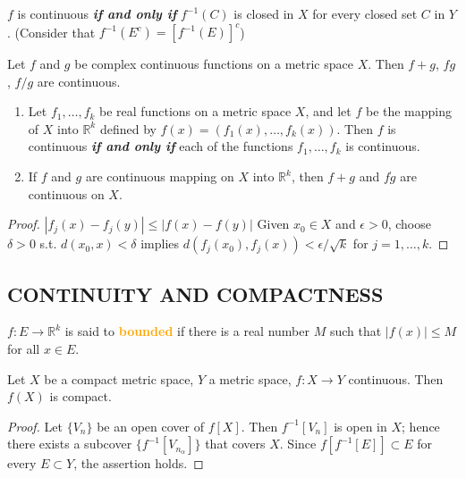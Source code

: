 \begin{corollary}
$f$ is continuous \textbf{\emph{if and only if}} $f^{-1}(C)$ is closed in $X$ for every closed set $C$ in $Y$. (Consider that $f^{-1}(E^c)=[f^{-1}(E)]^c$)
\end{corollary}

\begin{theorem}
Let $f$ and $g$ be complex continuous functions on a metric space $X$. Then $f+g$, $fg$, $f/g$ are continuous.
\end{theorem}

\begin{theorem}
\begin{enumerate}[label={(\alph*)}]
\item Let $f_1,\dots,f_k$ be real functions on a metric space $X$, and let $f$ be the mapping of $X$ into $\mathbb{R}^k$ defined by $f(x)=(f_1(x),\dots, f_k(x))$. Then $f$ is continuous \textbf{\emph{if and only if}} each of the functions $f_1,\dots,f_k$ is continuous.
\item If $f$ and $g$ are continuous mapping on $X$ into $\mathbb{R}^k$, then $f+g$ and $f\dot g$ are continuous on $X$.
\end{enumerate}
\end{theorem}
\begin{proof}
\forward $|f_j(x)-f_j(y)| \leq |f(x)-f(y)|$
\backward Given $x_0\in X$ and $\epsilon>0$, choose $\delta>0$ s.t. $d(x_0,x)<\delta$ implies $d(f_j(x_0), f_j(x))< \epsilon / \sqrt{k}$ for $j=1,\dots, k$.
\end{proof}

\subsection{CONTINUITY AND COMPACTNESS}

\begin{definition}
$f:E\to \mathbb{R}^k$ is said to \textbf{\textcolor{orange}{bounded}} if there is a real number $M$ such that $|f(x)|\leq M$ for all $x\in E$.
\end{definition}

\begin{theorem}
Let $X$ be a compact metric space, $Y$ a metric space, $f:X\to Y$ continuous. Then $f(X)$ is compact.
\end{theorem}
\begin{proof}
Let $\{V_n\}$ be an open cover of $f[X]$. Then $f^{-1}[V_n]$ is open in $X$; hence there exists a subcover $\{f^{-1}[V_{n_\alpha}]\}$ that covers $X$. Since $f[f^{-1}[E]]\subset E$ for every $E\subset Y$, the assertion holds.
\end{proof}

